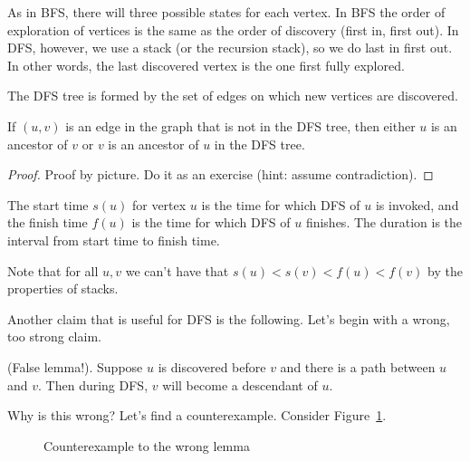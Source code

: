As in BFS, there will three possible states for each vertex. In BFS
the order of exploration of vertices is the same as the order of
discovery (first in, first out). In DFS, however, we use a stack (or
the recursion stack), so we do last in first out. In other words, the
last discovered vertex is the one first fully explored.

The DFS tree is formed by the set of edges on which new vertices are
discovered.


\begin{lemma}
    If $(u, v)$ is an edge in the graph that is not in the DFS tree,
    then either $u$ is an ancestor of $v$ or $v$ is an ancestor of
    $u$ in the DFS tree.
\end{lemma}

\begin{proof}
    Proof by picture. Do it as an exercise (hint: assume
    contradiction).
\end{proof}


\begin{definition}
The start time $s(u)$ for vertex $u$ is the time for
which DFS of $u$ is invoked, and the finish time $f(u)$ is the time for
which
DFS of $u$ finishes. The duration is the interval from start time to
finish time.
\end{definition}

Note that for all $u, v$ we can't have that $s(u) < s(v) < f(u) <
f(v)$ by the properties of stacks.

Another claim that is useful for DFS is the following. Let's begin
with a wrong, too strong claim.

\begin{lemma}
    (False lemma!). Suppose $u$ is discovered before $v$ and there is a
    path between $u$ and $v$. Then during DFS, $v$ will become a
    descendant of $u$.
\end{lemma}

Why is this wrong? Let's find a counterexample. Consider Figure~\ref{fig:dfs-wrong-lemma}.

\begin{figure}[hpt]
\centering
\caption{Counterexample to the wrong lemma}
\label{fig:dfs-wrong-lemma}
\end{figure}

